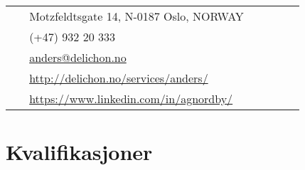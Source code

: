 \documentclass[10pt]{article} %
\begin{document}
\begin{paracol}{2}

\parbox[top][0.12\textheight][c]{\linewidth}{ %
	\vspace{-0.04\textheight} %
	\colorbox{shade}{ %
		\begin{supertabular}{p{0.05\linewidth}|p{0.775\linewidth}} %
			\raisebox{-1pt}{\faHome} & Motzfeldtsgate 14, N-0187 Oslo, NORWAY \\ %
			\raisebox{-1pt}{\faPhone} & (+47) 932 20 333 \\ %
			\raisebox{0pt}{\small\faEnvelope} & \href{mailto:anders@delichon.no}{anders@delichon.no} \\ %
			\raisebox{-1pt}{\small\faDesktop} & \href{http://delichon.no/services/anders/}{http://delichon.no/services/anders/} \\ %
			\raisebox{-1pt}{\faLinkedinSquare} & \href{https://www.linkedin.com/in/agnordby/}{https://www.linkedin.com/in/agnordby/} \\ %
		\end{supertabular}
	}
}


\section{Kvalifikasjoner}




\end{paracol}
\end{document}
